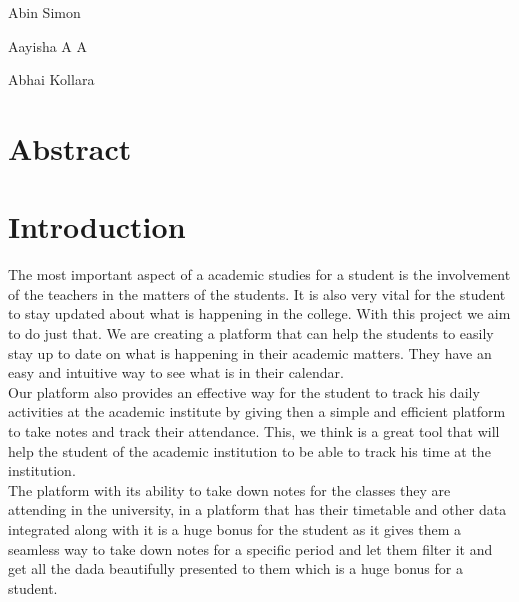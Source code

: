 \documentclass{article}
\begin{document}
\vspace{5em}

\begin{minipage}[b]{0.33333\textwidth}
\raggedright
Abin Simon
\end{minipage}%
\begin{minipage}[b]{0.33333\textwidth}
\centering
Aayisha A A
\end{minipage}%
\begin{minipage}[b]{0.33333\textwidth}
\raggedleft
Abhai Kollara
\end{minipage}

\newpage

\section{Abstract}
\vspace{1em}

\newpage

\section{Introduction}
\hspace{1em}

\Large
The most important aspect of a academic studies for a student is the involvement of the teachers in the matters of the students. It is also very vital for the student to stay updated about what is happening in the college. With this project we aim to do just that. We are creating a platform that can help the students to easily stay up to date on what is happening in their academic matters. They have an easy and intuitive way to see what is in their calendar.\\

\vspace{1em}
\Large
Our platform also provides an effective way for the student to track his daily activities at the academic institute by giving then a simple and efficient platform to take notes and track their attendance. This, we think is a great tool that will help the student of the academic institution to be able to track his time at the institution.\\

\vspace{1em}
\Large
The platform with its ability to take down notes for the classes they are attending in the university, in a platform that has their timetable and other data integrated along with it is a huge bonus for the student as it gives them a seamless way to take down notes for a specific period and let them filter it and get all the dada beautifully presented to them which is a huge bonus for a student.
\end{document}
